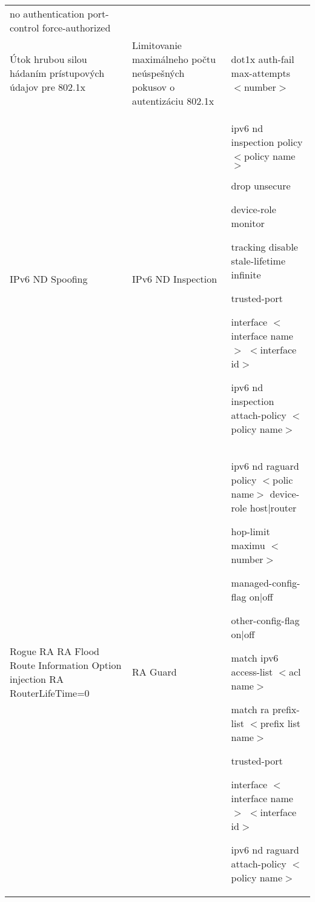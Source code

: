\begin{longtable}[!htbp]{|L{10em}L{10em}>{\selectfont}L{34em}|}
	\hspace{0.5em}no authentication port-control force-authorized\\
	
	
	
	Útok hrubou silou hádaním prístupových údajov pre 802.1x 	&Limitovanie maximálneho počtu neúspešných pokusov o autentizáciu 802.1x	&dot1x auth-fail max-attempts $<$number$>$\\
	
	
	
	
	IPv6 ND Spoofing	&IPv6 ND Inspection	&ipv6 nd inspection policy $<$policy name$>$
	
	\hspace{0.5em}drop unsecure
	
	\hspace{0.5em}device-role monitor
	
	\hspace{0.5em}tracking disable stale-lifetime infinite
	
	\hspace{0.5em}trusted-port
	
	interface $<$interface name$>$ $<$interface id$>$
	
	\hspace{0.5em}ipv6 nd inspection attach-policy  $<$policy name$>$\\
	
	
	
	Rogue RA
	RA Flood
	Route Information Option injection
	RA RouterLifeTime=0
	&RA Guard	&ipv6 nd raguard policy $<$polic name$>$
	device-role host|router
	
	\hspace{0.5em}hop-limit maximu $<$number$>$
	
	\hspace{0.5em}managed-config-flag on|off
	
	\hspace{0.5em}other-config-flag on|off
	
	\hspace{0.5em}match ipv6 access-list $<$acl name$>$
	
	\hspace{0.5em}match ra prefix-list $<$prefix list name$>$
	
	\hspace{0.5em}trusted-port
	
	interface $<$interface name$>$ $<$interface id$>$
	
	\hspace{0.5em}ipv6 nd raguard attach-policy $<$policy name$>$\\
	

\end{longtable}
